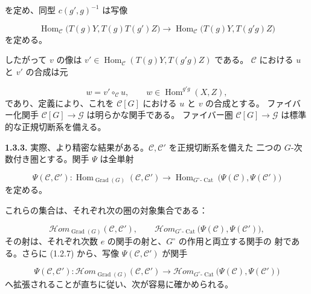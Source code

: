 \clearpage
{}%
を定め、同型 $c(g',g)^{-1}$ は写像

\begin{equation}
  \operatorname{Hom}_{\mathcal C}
    \bigl(T(g)Y,T(g)T(g')Z\bigr)
  \longrightarrow
  \operatorname{Hom}_{\mathcal C}
    \bigl(T(g)Y,T(g'g)Z\bigr)
  \tag{1.3.2.4}
\end{equation}
を定める。

したがって $v$ の像は
$v'\in\operatorname{Hom}_{\mathcal C}(T(g)Y,T(g'g)Z)$ である。
$\mathcal C$ における $u$ と $v'$ の合成は元

\begin{equation}
  w=v'\mathbin{\circ_{\mathcal C}}u,
  \qquad w\in\operatorname{Hom}^{g'g}(X,Z),
  \tag{1.3.2.5}
\end{equation}
であり、定義により、これを $\mathcal C[G]$ における $u$ と $v$ の合成とする。
ファイバー化関手 $\mathcal C[G]\to\mathcal G$ は明らかな関手である。
ファイバー圏 $\mathcal C[G]\to\mathcal G$ は標準的な正規切断系を備える。

\noindent\textbf{1.3.3.}\quad
実際、より精密な結果がある。$\mathcal C,\mathcal C'$ を正規切断系を備えた
二つの $G$-次数付き圏とする。関手 $\Psi$ は全単射

\begin{equation}
  \Psi(\mathcal C,\mathcal C')\colon
  \operatorname{Hom}_{\operatorname{Grad}(G)}(\mathcal C,\mathcal C')
  \longrightarrow
  \operatorname{Hom}_{G^\circ\text{-}\operatorname{Cat}}
    \bigl(\Psi(\mathcal C),\Psi(\mathcal C')\bigr)
  \tag{1.3.3.1}
\end{equation}
を定める。

これらの集合は、それぞれ次の圏の対象集合である：

\begin{equation}
  \mathcal{H}\!om_{\operatorname{Grad}(G)}(\mathcal C,\mathcal C'),
  \qquad
  \mathcal{H}\!om_{G^\circ\text{-}\operatorname{Cat}}
    \bigl(\Psi(\mathcal C),\Psi(\mathcal C')\bigr),
  \tag{1.3.3.2}
\end{equation}
その射は、それぞれ次数 $e$ の関手の射と、$G^\circ$ の作用と両立する関手の
射である。さらに (1.2.7) から、写像 $\Psi(\mathcal C,\mathcal C')$ が関手

\begin{equation}
  \Psi(\mathcal C,\mathcal C')\colon
  \mathcal{H}\!om_{\operatorname{Grad}(G)}(\mathcal C,\mathcal C')
  \longrightarrow
  \mathcal{H}\!om_{G^\circ\text{-}\operatorname{Cat}}
    \bigl(\Psi(\mathcal C),\Psi(\mathcal C')\bigr)
  \tag{1.3.3.3}
\end{equation}
へ拡張されることが直ちに従い、次が容易に確かめられる。

